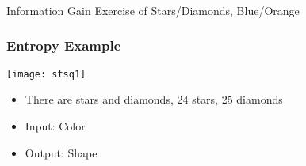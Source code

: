 


\begin{frame}[fragile]\frametitle{}
\begin{center}
{\Large Information Gain Exercise of Stars/Diamonds, Blue/Orange}
\end{center}
\end{frame}


\begin{frame}[fragile]\frametitle{Entropy Example}
\begin{center}
\texttt{[image: stsq1]}
\end{center}
\begin{itemize}
\item There are stars and diamonds, 24 stars, 25 diamonds
\item Input: Color
\item Output: Shape
\end{itemize}
\end{frame}


